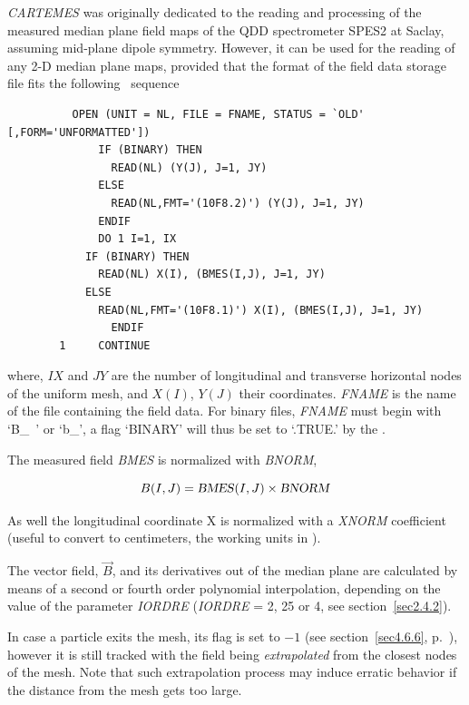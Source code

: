 \textsl{CARTEMES}  was originally dedicated to the reading 
and processing of the measured median plane field maps of the QDD spectrometer  SPES2 at Saclay, 
assuming mid-plane dipole symmetry.  However, it can be
used for the reading of any 2-D median plane maps, provided that the format of the
field data storage file fits the following \FORTRAN\ sequence 


{\footnotesize
\begin{verbatim}
	      OPEN (UNIT = NL, FILE = FNAME, STATUS = `OLD' [,FORM='UNFORMATTED'])
              IF (BINARY) THEN 
                READ(NL) (Y(J), J=1, JY)
              ELSE
                READ(NL,FMT='(10F8.2)') (Y(J), J=1, JY)
              ENDIF
              DO 1 I=1, IX
	        IF (BINARY) THEN 
	          READ(NL) X(I), (BMES(I,J), J=1, JY)
	        ELSE
	          READ(NL,FMT='(10F8.1)') X(I), (BMES(I,J), J=1, JY) 
                ENDIF
        1     CONTINUE
\end{verbatim}}

\noindent where, $IX$  and $JY$  are the number of longitudinal
and transverse horizontal nodes of the uniform mesh, and $X(I)$, $Y(J)$ their coordinates.  
\textsl{FNAME} 
 is the name of the file containing the field data. For binary files, \textsl{FNAME} must begin with
\mbox{`B\_ '} or \mbox{`b\_'},  a flag `BINARY' will thus be set to `.TRUE.' by the \FORTRAN.  
\bigskip

\noindent The measured field \textsl{BMES} is normalized with \textsl{BNORM},

$$ B(I,J) = \text{\textsl{BMES}}(I,J) \times  \text{\textsl{BNORM}} $$

\noindent As well the longitudinal coordinate  X is normalized with 
a  \textsl{XNORM} coefficient (useful to convert to centimeters, the working units in  \zgoubi). 

\noindent The vector field, $ \vec  B $, and its derivatives out of the median
plane are calculated by means of a second or fourth order polynomial 
interpolation, depending on 
the value of the parameter \textsl{IORDRE} (\textsl{IORDRE} = 2, 25 or 4, 
see section~\ref{sec2.4.2}). 
\bigskip

\noindent In case a particle  exits the mesh, its \IEX{} flag is set to $-1$ (see section~\ref{sec4.6.6}, 
p.~\pageref{sec4.6.6}), however it is still tracked with the field being {\it extrapolated} from 
the closest  nodes of the mesh. Note that such extrapolation process may induce erratic behavior if the distance from the mesh gets 
too large. 

